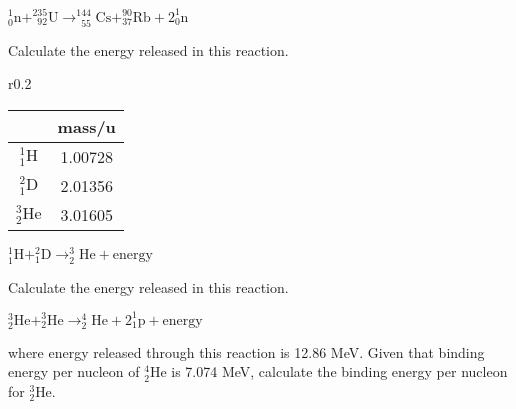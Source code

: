 
{
	
	\centering
	
	$^1_0\text{n} + ^{235}_{\phantom{2}92}\text{U} \longrightarrow ^{144}_{\phantom{1}55}\text{Cs} + ^{90}_{37}\text{Rb} + 2^1_0\text{n}$	
	
}

\noindent Calculate the energy released in this reaction.


\begin{wrapfigure}{r}{0.2\textwidth}
	\vspace*{-21pt}
	\flushright
	\begin{tabular}{|c|c|}
		\hline
		& mass/u \\ \hline
		$^1_1\text{H}$ & 1.00728 \\ \hline
		$^2_1\text{D}$ & 2.01356 \\ \hline 
		$^3_2\text{He}$ & 3.01605 \\ \hline
	\end{tabular}
	\vspace*{-10pt}
\end{wrapfigure}




{

\centering

$ ^1_1\text{H} + ^2_1\text{D} \longrightarrow ^3_2\text{He} + \text{energy}$

}
	
\noindent Calculate the energy released in this reaction.






{
	
	\centering

	$^3_2\text{He} + ^3_2\text{He} \longrightarrow ^4_2\text{He} + 2 ^1_1\text{p} +\text{energy}$	
	
}

\noindent where energy released through this reaction is 12.86 MeV. Given that binding energy per nucleon of $^4_2\text{He}$ is 7.074 MeV, calculate the binding energy per nucleon for $^3_2\text{He}$.

